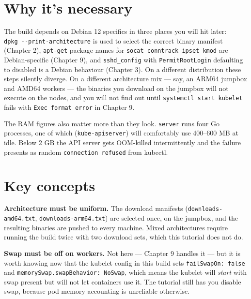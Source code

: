 \documentclass[11pt,oneside]{report}
\begin{document}
\hypertarget{why-its-necessary-1}{%
\section{Why it's
necessary}\label{why-its-necessary-1}}

\begin{whybox}

The build depends on
Debian 12 specifics
in three places you
will hit later:
\texttt{dpkg\ -\/-print-}\allowbreak{}\texttt{architecture}
is used to select
the correct binary
manifest (Chapter
2), \texttt{apt-get}
package names for
\texttt{socat\ conntrack\ ipset\ kmod}
are Debian-specific
(Chapter 9), and
\texttt{sshd\_config}
with
\texttt{PermitRootLogin}
defaulting to
disabled is a Debian
behaviour (Chapter
3). On a different
distribution these
steps silently
diverge. On a
different
architecture mix ---
say, an ARM64
jumpbox and AMD64
workers --- the
binaries you
download on the
jumpbox will not
execute on the
nodes, and you will
not find out until
\texttt{systemctl\ start\ kubelet}
fails with
\texttt{Exec\ format\ error}
in Chapter 9.

\end{whybox}

The RAM figures also
matter more than
they look.
\texttt{server} runs
four Go processes,
one of which
(\texttt{kube-apiserver})
will comfortably use
400--600 MB at idle.
Below 2 GB the API
server gets
OOM-killed
intermittently and
the failure presents
as random
\texttt{connection\ refused}
from kubectl.

\hypertarget{key-concepts-1}{%
\section{Key
concepts}\label{key-concepts-1}}

\textbf{Architecture
must be uniform.}
The download
manifests
(\texttt{downloads-}\allowbreak{}\texttt{amd64.}\allowbreak{}\texttt{txt},
\texttt{downloads-}\allowbreak{}\texttt{arm64.}\allowbreak{}\texttt{txt})
are selected once,
on the jumpbox, and
the resulting
binaries are pushed
to every machine.
Mixed architectures
require running the
build twice with two
download sets, which
this tutorial does
not do.

\textbf{Swap must be
off on workers.} Not
here --- Chapter 9
handles it --- but
it is worth knowing
now that the kubelet
config in this build
sets
\texttt{failSwapOn:}\allowbreak{}\texttt{\ false}
and
\texttt{memorySwap.}\allowbreak{}\texttt{swapBehavior:}\allowbreak{}\texttt{\ NoSwap},
which means the
kubelet will
\emph{start} with
swap present but
will not let
containers use it.
The tutorial still
has you disable
swap, because pod
memory accounting is
unreliable
otherwise.
\end{document}
